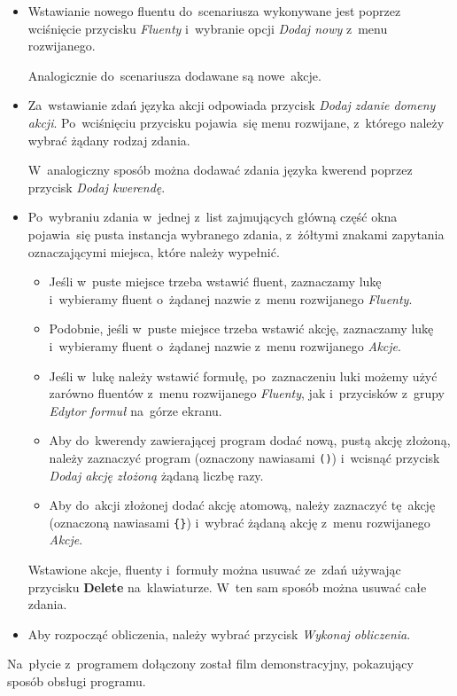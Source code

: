 \documentclass[11pt,a4paper]{article}
\begin{document}
\begin{itemize}
    \item Wstawianie nowego fluentu do~scenariusza wykonywane jest poprzez wciśnięcie przycisku \emph{Fluenty} i~wybranie opcji \emph{Dodaj nowy} z~menu rozwijanego.

    Analogicznie do~scenariusza dodawane są nowe~akcje.
    \item Za~wstawianie zdań języka akcji odpowiada przycisk \emph{Dodaj zdanie domeny akcji}.
    Po~wciśnięciu przycisku pojawia~się menu rozwijane, z~którego należy wybrać żądany rodzaj zdania.

    W~analogiczny sposób można dodawać zdania języka kwerend poprzez przycisk \emph{Dodaj kwerendę}.
    \item Po~wybraniu zdania w~jednej z~list zajmujących główną część okna pojawia~się pusta instancja wybranego zdania, z~żółtymi znakami zapytania oznaczającymi miejsca, które należy wypełnić.
    \begin{itemize}
        \item Jeśli w~puste miejsce trzeba wstawić fluent, zaznaczamy lukę i~wybieramy fluent o~żądanej nazwie z~menu rozwijanego \emph{Fluenty}.
        \item Podobnie, jeśli w~puste miejsce trzeba wstawić akcję, zaznaczamy lukę i~wybieramy fluent o~żądanej nazwie z~menu rozwijanego \emph{Akcje}.
        \item Jeśli w~lukę należy wstawić formułę, po~zaznaczeniu luki możemy użyć zarówno fluentów z~menu rozwijanego \emph{Fluenty}, jak i~przycisków z~grupy \emph{Edytor formuł} na~górze ekranu.
        \item Aby do~kwerendy zawierającej program dodać nową, pustą akcję złożoną, należy zaznaczyć program (oznaczony nawiasami \verb+()+) i~wcisnąć przycisk \emph{Dodaj akcję złożoną} żądaną liczbę razy.
        \item Aby do~akcji złożonej dodać akcję atomową, należy zaznaczyć tę~akcję (oznaczoną nawiasami \verb+{}+) i~wybrać żądaną akcję z~menu rozwijanego \emph{Akcje}.
    \end{itemize}
    Wstawione akcje, fluenty i~formuły można usuwać ze~zdań używając przycisku \textbf{Delete} na~klawiaturze.
    W~ten sam sposób można usuwać całe zdania.
    \item Aby rozpocząć obliczenia, należy wybrać przycisk \emph{Wykonaj obliczenia}.
\end{itemize}

Na~płycie z~programem dołączony został film demonstracyjny, pokazujący sposób obsługi programu.
\end{document}

